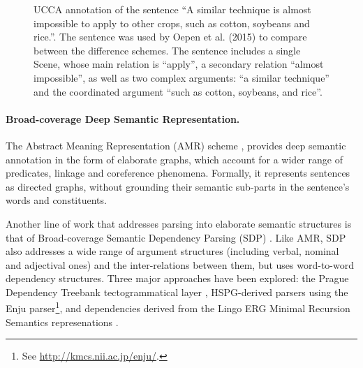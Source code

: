 \documentclass[11pt]{article}
\begin{document}
\begin{figure*}
\begin{adjustbox}{width=\textwidth}
\end{adjustbox}
\caption{\label{fig:ucca_example}
  UCCA annotation of the sentence ``A similar technique is almost impossible to
  apply to other crops, such as cotton, soybeans and rice.''.
  The sentence was used by Oepen et al. (2015) to compare between the difference schemes. The sentence includes a single Scene, whose main relation is ``apply'', a secondary relation ``almost impossible'', as well as two complex arguments: ``a similar technique'' and the coordinated argument ``such as cotton, soybeans, and rice''.
}
\end{figure*}

\paragraph{Broad-coverage Deep Semantic Representation.}
The Abstract Meaning Representation (AMR) scheme \cite{banarescu2013abstract},
provides deep semantic annotation in the form of elaborate graphs,
which account for a wider range of predicates, linkage and coreference phenomena.
Formally, it represents sentences as directed graphs, without grounding their
semantic sub-parts in the sentence's words and constituents.

Another line of work that addresses parsing into elaborate semantic structures
is that of Broad-coverage Semantic Dependency Parsing (SDP) \cite{oepen2014semeval,oepen2015semeval}.
Like AMR, SDP also addresses a wide range of argument structures (including verbal, nominal and
adjectival ones) and the inter-relations between them, but uses word-to-word dependency structures.
Three major approaches have been explored:
the Prague Dependency Treebank tectogrammatical layer \cite{bohmova2003prague},
HSPG-derived parsers using the Enju parser\footnote{See \url{http://kmcs.nii.ac.jp/enju/}.},
and dependencies derived from the Lingo ERG Minimal Recursion Semantics represenations \cite{Flic:02}.
\end{document}
